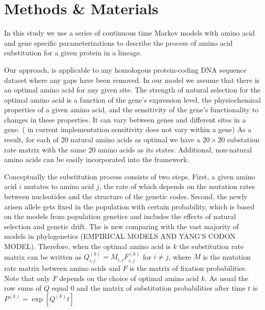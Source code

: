 \section{Methods \& Materials}
In this study we use a series of continuous time Markov models with amino acid and gene specific parameterizations to describe the process of amino acid substitution for a given protein in a lineage. 

Our approach, is applicable to any homologous protein-coding DNA sequence dataset where any gaps have been removed.
In our model we assume that there is an optimal amino acid for any given site.
The strength of natural selection for the optimal amino acid is a function of the gene's expression level, the physiochemical properties of a given amino acid, and the sensitivity of the gene's functionality to changes in these properties.
It can vary between genes and different sites in a gene. ({\color{blue} in current implementation sensitivity does not vary within a gene})
As a result, for each of 20 natural amino acids as optimal we have a $20 \times 20$ substation rate matrix with the same 20 amino acids as its states. 
Additional, non-natural amino acids can be easily incorporated into the framework.


Conceptually the substitution process consists of two steps. 
First, a given amino acid $i$ mutates to amino acid $j$, the rate of which depends on the mutation rates between nucleotides and the structure of the genetic codes. 
Second, the newly arisen allele gets fixed in the population with certain probability, which is based on the models from population genetics and includes the effects of natural selection and genetic drift. 
The is new comparing with the vast majority of models in phylogenetics (EMPIRICAL MODELS AND YANG'S CODON MODEL).
Therefore, when the optimal amino acid is $k$ the substitution rate matrix can be written as $Q_{i,j}^{(k)}=M_{i,j}F_{i,j}^{(k)}$ for $i \ne j$, where $M$ is the mutation rate matrix between amino acids and $F$ is the matrix of fixation probabilities. 
Note that only $F$ depends on the choice of optimal amino acid $k$. 
As usual the row sums of $Q$ equal $0$ and the matrix of substitution probabilities after time $t$ is $P^{(k)} = \exp [Q^{(k)}t]$

